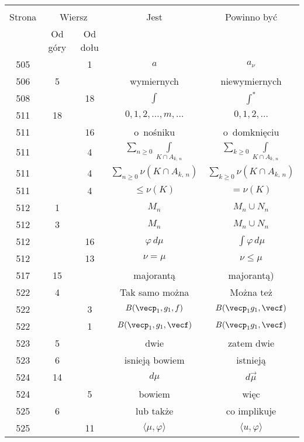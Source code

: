 \documentclass[a4paper,11pt]{article}
\numberwithin{equation}{section}
\begin{document}
\begin{center}
  \begin{tabular}{|c|c|c|c|c|}
    \hline
    & \multicolumn{2}{c|}{} & & \\
    Strona & \multicolumn{2}{c|}{Wiersz} & Jest
                              & Powinno być \\ \cline{2-3}
    & Od góry & Od dołu & & \\
    \hline
    505 & &  1 & $a$ & $a_{ \nu }$ \\
    506 &  5 & & wymiernych & niewymiernych \\
    508 & & 18 & $\int$ & $\int^{ * }$ \\
    511 & 18 & & $0, 1, 2, \ldots, m, \ldots$ & $0, 1, 2, \ldots$ \\
    511 & & 16 & o~nośniku & o~domknięciu \\
    511 & &  4 & $\sum\limits_{ n \geq 0 } \int\limits_{ K \cap A_{ k,\, n } }$
           & $\sum\limits_{ k \geq 0 } \int\limits_{ K \cap A_{ k,\, n } }$ \\
    511 & &  4 & $\sum\limits_{ n \geq 0 } \nu( K \cap A_{ k,\, n } )$
           & $\sum\limits_{ k \geq 0 } \nu( K \cap A_{ k,\, n } )$ \\
    511 & &  4 & $\leq \nu( K )$ & $= \nu( K )$ \\
    512 &  1 & & $M_{ n }$ & $M_{ n } \cup N_{ n }$ \\
    512 &  3 & & $M_{ n }$ & $M_{ n } \cup N_{ n }$ \\
    512 & & 16 & $\varphi \, d\mu$ & $\int \varphi \, d\mu$ \\
    512 & & 13 & $\nu = \mu$ & $\nu \leq \mu$ \\
    517 & 15 & & majorantą & majorantą) \\
    522 &  4 & & Tak samo można & Można też \\
    522 & &  3 & $B( \vecp_{ 1 }, g_{ 1 }, f )$
           & $B( \vecp_{ 1 } g_{ 1 }, \vecf )$ \\
    522 & &  1 & $B( \vecp_{ 1 }, g_{ 1 }, \vecf )$
           & $B( \vecp_{ 1 } g_{ 1 }, \vecf )$ \\
    523 &  5 & & dwie & zatem dwie \\
    523 &  6 & & isnieją bowiem & istnieją \\
    524 & 14 & & $d \mu$ & $d \vec{ \mu }$ \\
    524 & &  5 & bowiem & więc \\
    525 &  6 & & lub także & co implikuje \\
    525 & & 11 & $\langle \mu, \varphi \rangle$
           & $\langle u, \varphi \rangle$ \\

\end{tabular}
\end{center}
\end{document}
